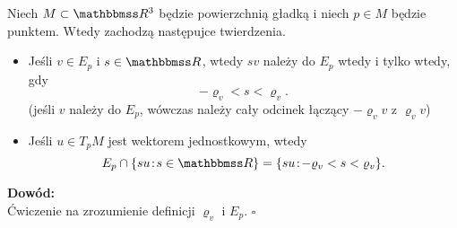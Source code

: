 \begin{frame}

\begin{lemat}
Niech $M\subset \R^3$ będzie powierzchnią gładką i niech $p\in M$ będzie punktem. Wtedy zachodzą następujce twierdzenia.
\begin{itemize}
\item Jeśli $v\in E_p$ i $s\in \R$, wtedy $sv$ należy do $E_p$ wtedy i tylko wtedy, gdy
\[-\varrho_v<s<\varrho_v.\]
\footnotesize (jeśli $v$ należy do $E_p$, w\'owczas należy cały odcinek łączący $-\varrho_v v$ z $\varrho_v v$)\normalsize
\pause\item Jeśli $u\in T_pM$ jest wektorem jednostkowym, wtedy 
\[E_p\cap \{su\colon s\in \R\}=\{su\colon -\varrho_v<s<\varrho_v\}.\]

\end{itemize}

\end{lemat}
\pause \textcolor{ared}{\textbf{Dowód:}}\\
Ćwiczenie na zrozumienie definicji $\varrho_v$ i $E_p$.
\hfill $\square$
\end{frame}


